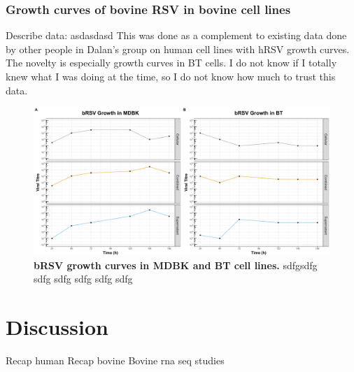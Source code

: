 \subsubsection{Growth curves of bovine RSV in bovine cell lines} \label{Growth curves of bovine RSV in bovine cell lines}
Describe data: \newline
asdasdasd \newline
This was done as a complement to existing data done by other people in Dalan’s group on human cell lines with hRSV growth curves. The novelty is especially growth curves in BT cells. I do not know if I totally knew what I was doing at the time, so I do not know how much to trust this data.  

\begin{figure}
    \centering
    \includegraphics[width=1\linewidth]{07. Chapter 2/Figs/01. Technologies/01. growth_curves.pdf}
    \caption[bRSV growth curves in MDBK and BT cell lines.]{\textbf{bRSV growth curves in MDBK and BT cell lines.} sdfgsdfg sdfg sdfg sdfg sdfg sdfg }
    \label{bRSV growth curves in MDBK and BT cell lines}
\end{figure}




\section{Discussion} \label{Discussion Chapter2}
Recap human \newline
Recap bovine \newline
Bovine rna seq studies



